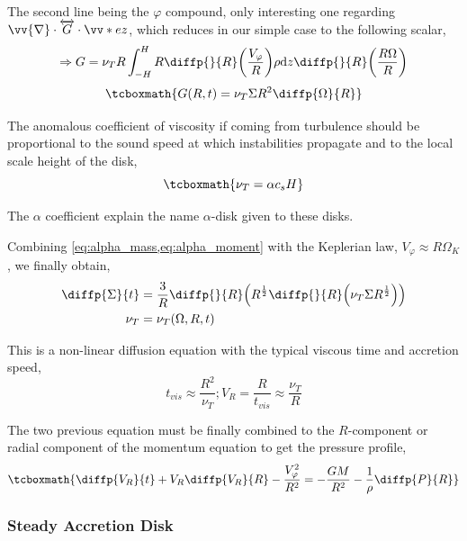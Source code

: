\documentclass[10pt,a4paper,english]{article}
\let\originalleft\left
\let\originalright\right
\renewcommand{\left}{\mathopen{}\mathclose\bgroup\originalleft}
\renewcommand{\right}{\aftergroup\egroup\originalright}
\begin{document}
The second line being the $\varphi$ compound, only interesting one regarding
$\vv{\nabla} \cdot \overleftrightarrow{G} \cdot \vv*{e}{z}$, which reduces in our simple
case to the following scalar,
\begin{equation*}
    \Rightarrow G = \nu_T R \int_{-H}^H R \diffp{}{R} \left( \frac{V_\varphi}{R} \right) \rho \d{z} \diffp{}{R} \left(\frac{R \Omega}{R}\right)
\end{equation*}
\begin{equation}
    \tcboxmath{
        G(R,t) = \nu_T \Sigma R^2 \diffp{\Omega}{R}
    }
\end{equation}

The anomalous coefficient of viscosity if coming from turbulence should be
proportional to the sound speed at which instabilities propagate and to the
local scale height of the disk,
\begin{equation}
    \tcboxmath{
        \nu_T = \alpha c_s H
    }
\end{equation}

The $\alpha$ coefficient explain the name $\alpha$-disk given to these disks.

Combining \cref{eq:alpha_mass,eq:alpha_moment} with the Keplerian law,
$V_\varphi \approx R \Omega_K$, we finally obtain,
\begin{align*}
    \diffp{\Sigma}{t} &= \frac{3}{R} \diffp{}{R} \left( R^\frac{1}{2} \diffp{}{R} \left( \nu_T \Sigma R^\frac{1}{2} \right) \right) \\
    \nu_T &= \nu_T(\Omega,R,t)
\end{align*}

This is a non-linear diffusion equation with the typical viscous time and
accretion speed,
\begin{equation*}
    t_{vis} \approx \frac{R^2}{\nu_T} ; V_R = \frac{R}{t_{vis}} \approx \frac{\nu_T}{R}
\end{equation*}

The two previous equation must be finally combined to the $R$-component or
radial component of the momentum equation to get the pressure profile,
\begin{equation}
    \tcboxmath{
        \diffp{V_R}{t} + V_R \diffp{V_R}{R} - \frac{V_\varphi^2}{R^2} = - \frac{GM}{R^2} - \frac{1}{\rho} \diffp{P}{R}
    }
\end{equation}

\subsubsection{Steady Accretion Disk}
\end{document}
